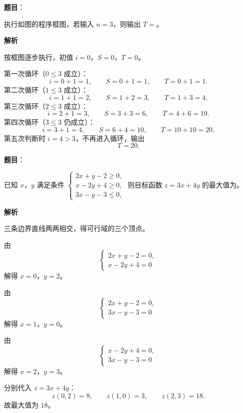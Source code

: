 \begin{answer}

\textbf{题目}：

执行如图的程序框图，若输入 $n=3$，则输出 $T=$\gkblank{}。
\nopagebreak[4]
\begin{center}\end{center}
\nopagebreak[4]
\textbf{解析}

按框图逐步执行，初值 $i=0$，$S=0$，$T=0$。

第一次循环（$0\leqslant3$ 成立）：
\nopagebreak[4]
\[i=0+1=1,\qquad S=0+1=1,\qquad T=0+1=1.\]
第二次循环（$1\leqslant3$ 成立）：
\nopagebreak[4]
\[i=1+1=2,\qquad S=1+2=3,\qquad T=1+3=4.\]
第三次循环（$2\leqslant3$ 成立）：
\nopagebreak[4]
\[i=2+1=3,\qquad S=3+3=6,\qquad T=4+6=10.\]
第四次循环（$3\leqslant3$ 仍成立）：
\nopagebreak[4]
\[i=3+1=4,\qquad S=6+4=10,\qquad T=10+10=20.\]
第五次判断时 $i=4>3$，不再进入循环，输出
\nopagebreak[4]
\[T=20.\]


\end{answer}
\begin{answer}

\textbf{题目}：

已知 $x$，$y$ 满足条件 $\begin{cases}2x+y-2\geqslant 0,\\x-2y+4\geqslant 0,\\3x-y-3\leqslant 0,\end{cases}$ 则目标函数 $z=3x+4y$ 的最大值为\gkblank{}。

\textbf{解析}

三条边界直线两两相交，得可行域的三个顶点。

由
\nopagebreak[4]
\[\begin{cases}2x+y-2=0,\\x-2y+4=0\end{cases}\]
解得 $x=0$，$y=2$。

由
\nopagebreak[4]
\[\begin{cases}2x+y-2=0,\\3x-y-3=0\end{cases}\]
解得 $x=1$，$y=0$。

由
\nopagebreak[4]
\[\begin{cases}x-2y+4=0,\\3x-y-3=0\end{cases}\]
解得 $x=2$，$y=3$。

分别代入 $z=3x+4y$：
\nopagebreak[4]
\[z(0,2)=8,\qquad z(1,0)=3,\qquad z(2,3)=18.\]
故最大值为 $18$。


\end{answer}
